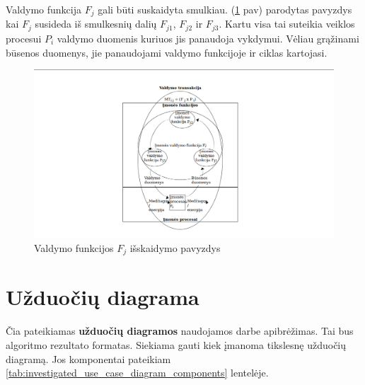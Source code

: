 \documentclass{VUMIFInfBakalaurinis}
\begin{document}
Valdymo funkcija $F_j$ gali būti suskaidyta smulkiau. (\ref{img:splitted_management_function} pav) parodytas pavyzdys kai $F_j$ susideda iš smulkesnių dalių $F_{j1}$, $F_{j2}$ ir $F_{j3}$. Kartu visa tai suteikia veiklos procesui $P_i$ valdymo duomenis kuriuos jis panaudoja vykdymui. Vėliau grąžinami būsenos duomenys, jie panaudojami valdymo funkcijoje ir ciklas kartojasi.

\begin{figure}[H]
	\centering
	\includegraphics[width=\textwidth]{img/splitted_management_function}
	\caption{Valdymo funkcijos $F_j$ išskaidymo pavyzdys}
	\label{img:splitted_management_function}
\end{figure} 


\section{Užduočių diagrama}

Čia pateikiamas \textbf{užduočių diagramos} naudojamos darbe apibrėžimas. Tai bus algoritmo rezultato formatas. Siekiama gauti kiek įmanoma tikslesnę užduočių diagramą. Jos komponentai pateikiam \ref{tab:investigated_use_case_diagram_components} lentelėje.
\end{document}
